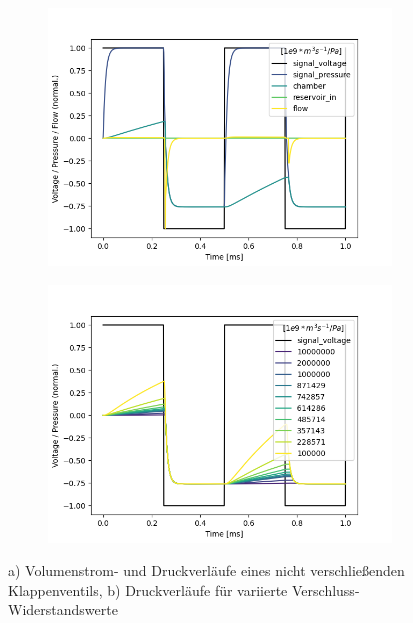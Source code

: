 \documentclass[fontsize=12pt, a4paper]{scrartcl}
\begin{document}
\begin{figure}[H]
	\centering
	\begin{subfigure}[H]{0.48\textwidth}
		\includegraphics[width=\textwidth, valign=t]{bilder/leakage/leakage_in_branch_singleweep.png}
	\end{subfigure}
	\begin{subfigure}[H]{0.48\textwidth}
		\includegraphics[width=\textwidth, valign=t]{bilder/leakage/leakage_in_branch_multiweep.png}
	\end{subfigure}
    \caption{a) Volumenstrom- und Druckverläufe eines nicht verschließenden Klappenventils, b) Druckverläufe für variierte Verschluss-Widerstandswerte}
    \label{fig:leckagedruck}
\end{figure}
\end{document}
